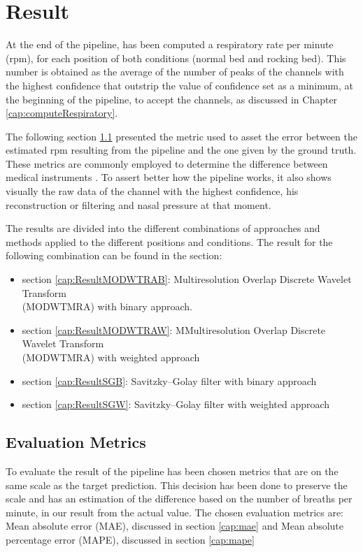 

\chapter{Result}

At the end of the pipeline, has been computed a respiratory rate per minute (rpm), for each position of both conditions (normal bed and rocking bed). This number is obtained as the average of the number of peaks of the channels with the highest confidence that outstrip the value of confidence set as a minimum, at the beginning of the pipeline, to accept the channels, as discussed in Chapter \ref{cap:computeRespiratory}. 

The following section \ref{cap:metrics} presented the metric used to asset the error between the estimated rpm resulting from the pipeline and the one given by the ground truth. These metrics are commonly employed to determine the difference between medical instruments    \cite{Hunt2015IdentificationExercise,HoogAntink2020BallistocardiographyIntervention, Sadek2020AStudy}.
To assert better how the pipeline works, it also shows visually the raw data of the channel with the highest confidence, his reconstruction or filtering and nasal pressure at that moment.

The results are divided into the different combinations of approaches and methods applied to the different positions and conditions.
The result for the following combination can be found in the section:
\begin{itemize}
  \item section \ref*{cap:ResultMODWTRAB}: Multiresolution Overlap Discrete Wavelet Transform \\ (MODWTMRA) with binary approach.
  \item section \ref*{cap:ResultMODWTRAW}: MMultiresolution Overlap Discrete Wavelet Transform \\ (MODWTMRA) with weighted approach
  \item section \ref*{cap:ResultSGB}: Savitzky–Golay filter with binary approach
  \item section \ref*{cap:ResultSGW}: Savitzky–Golay filter with weighted approach   
\end{itemize}



\section{Evaluation Metrics} \label{cap:metrics}
To evaluate the result of the pipeline has been chosen metrics that are on the same scale as the target prediction. This decision has been done to preserve the scale and has an estimation of the difference based on the number of breaths per minute, in our result from the actual value.
The chosen evaluation metrics are: Mean absolute error (MAE), discussed in section \ref{cap:mae} and Mean absolute percentage error (MAPE), discussed in section \ref{cap:mape} %


